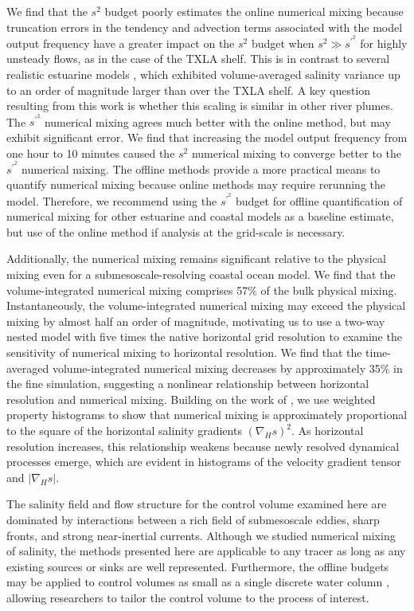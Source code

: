 \documentclass[draft]{agujournal2019}
\begin{document}
We find that the $s^2$ budget poorly estimates the online numerical mixing because truncation errors in the tendency and advection terms associated with the model output frequency have a greater impact on the $s^2$ budget when $s^2\gg s^{\prime^2}$ for highly unsteady flows, as in the case of the TXLA shelf. This is in contrast to several realistic estuarine models \cite{Li_2018, Li_2021, Warner_2020}, which exhibited volume-averaged salinity variance up to an order of magnitude larger than over the TXLA shelf. A key question resulting from this work is whether this scaling is similar in other river plumes. The $s^{\prime^2}$ numerical mixing agrees much better with the online method, but may exhibit significant error. We find that increasing the model output frequency from one hour to 10 minutes caused the $s^2$ numerical mixing to converge better to the $s^{\prime^2}$ numerical mixing. The offline methods provide a more practical means to quantify numerical mixing because online methods may require rerunning the model. Therefore, we recommend using the $s^{\prime^2}$ budget for offline quantification of numerical mixing for other estuarine and coastal models as a baseline estimate, but use of the online method if analysis at the grid-scale is necessary. 

Additionally, the numerical mixing remains significant relative to the physical mixing even for a submesoscale-resolving coastal ocean model. We find that the volume-integrated numerical mixing comprises 57$\%$ of the bulk physical mixing. Instantaneously, the volume-integrated numerical mixing may exceed the physical mixing by almost half an order of magnitude, motivating us to use a two-way nested model with five times the native horizontal grid resolution to examine the sensitivity of numerical mixing to horizontal resolution. We find that the time-averaged volume-integrated numerical mixing decreases by approximately 35$\%$ in the fine simulation, suggesting a nonlinear relationship between horizontal resolution and numerical mixing. Building on the work of , we use weighted property histograms to show that numerical mixing is approximately proportional to the square of the horizontal salinity gradients $(\nabla_H s)^2$. As horizontal resolution increases, this relationship weakens because newly resolved dynamical processes emerge, which are evident in histograms of the velocity gradient tensor and $|\nabla_H s|$.  

The salinity field and flow structure for the control volume examined here are dominated by interactions between a rich field of submesoscale eddies, sharp fronts, and strong near-inertial currents. Although we studied numerical mixing of salinity, the methods presented here are applicable to any tracer as long as any existing sources or sinks are well represented. Furthermore, the offline budgets may be applied to control volumes as small as a single discrete water column \cite{Wang_2021}, allowing researchers to tailor the control volume to the process of interest. 
\end{document}

